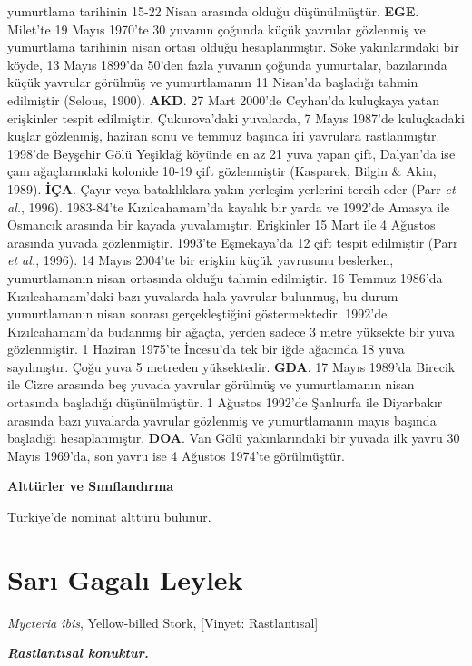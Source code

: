 \documentclass[
  a4paper,
  DIV=11,
  numbers=noendperiod]{scrreprt}
\begin{document}
yumurtlama tarihinin 15-22 Nisan arasında olduğu düşünülmüştür.
\textbf{EGE}. Milet'te 19 Mayıs 1970'te 30 yuvanın çoğunda küçük
yavrular gözlenmiş ve yumurtlama tarihinin nisan ortası olduğu
hesaplanmıştır. Söke yakınlarındaki bir köyde, 13 Mayıs 1899'da 50'den
fazla yuvanın çoğunda yumurtalar, bazılarında küçük yavrular görülmüş ve
yumurtlamanın 11 Nisan'da başladığı tahmin edilmiştir (Selous, 1900).
\textbf{AKD}. 27 Mart 2000'de Ceyhan'da kuluçkaya yatan erişkinler
tespit edilmiştir. Çukurova'daki yuvalarda, 7 Mayıs 1987'de kuluçkadaki
kuşlar gözlenmiş, haziran sonu ve temmuz başında iri yavrulara
rastlanmıştır. 1998'de Beyşehir Gölü Yeşildağ köyünde en az 21 yuva
yapan çift, Dalyan'da ise çam ağaçlarındaki kolonide 10-19 çift
gözlenmiştir (Kasparek, Bilgin \& Akin, 1989). \textbf{İÇA}. Çayır veya
bataklıklara yakın yerleşim yerlerini tercih eder (Parr \emph{et al.},
1996). 1983-84'te Kızılcahamam'da kayalık bir yarda ve 1992'de Amasya
ile Osmancık arasında bir kayada yuvalamıştır. Erişkinler 15 Mart ile 4
Ağustos arasında yuvada gözlenmiştir. 1993'te Eşmekaya'da 12 çift tespit
edilmiştir (Parr \emph{et al.}, 1996). 14 Mayıs 2004'te bir erişkin
küçük yavrusunu beslerken, yumurtlamanın nisan ortasında olduğu tahmin
edilmiştir. 16 Temmuz 1986'da Kızılcahamam'daki bazı yuvalarda hala
yavrular bulunmuş, bu durum yumurtlamanın nisan sonrası gerçekleştiğini
göstermektedir. 1992'de Kızılcahamam'da budanmış bir ağaçta, yerden
sadece 3 metre yüksekte bir yuva gözlenmiştir. 1 Haziran 1975'te
İncesu'da tek bir iğde ağacında 18 yuva sayılmıştır. Çoğu yuva 5
metreden yüksektedir. \textbf{GDA}. 17 Mayıs 1989'da Birecik ile Cizre
arasında beş yuvada yavrular görülmüş ve yumurtlamanın nisan ortasında
başladığı düşünülmüştür. 1 Ağustos 1992'de Şanlıurfa ile Diyarbakır
arasında bazı yuvalarda yavrular gözlenmiş ve yumurtlamanın mayıs
başında başladığı hesaplanmıştır. \textbf{DOA}. Van Gölü yakınlarındaki
bir yuvada ilk yavru 30 Mayıs 1969'da, son yavru ise 4 Ağustos 1974'te
görülmüştür.

\textbf{Alttürler ve Sınıflandırma}

Türkiye'de nominat alttürü bulunur.

\section{Sarı Gagalı Leylek}\label{sarux131-gagalux131-leylek}

\emph{Mycteria ibis}, Yellow-billed Stork, {[}Vinyet: Rastlantısal{]}

\textbf{\emph{Rastlantısal konuktur.}}
\end{document}
